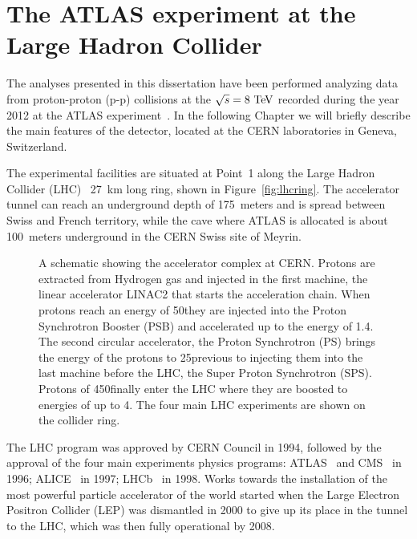 \clearpage{\pagestyle{empty}\cleardoublepage}

\chapter{The ATLAS experiment at the Large Hadron Collider}\label{chap:atlas}

The analyses presented in this dissertation have been performed analyzing data from 
proton-proton (p-p) collisions at the \cme $\rts=8\tev$ recorded during the year 2012 
at the ATLAS experiment~\cite{Aad:2008zzm}. In the following Chapter we will briefly 
describe the main features of the detector, located at the CERN laboratories in Geneva,
Switzerland.

The experimental facilities are situated at Point~1 along the Large Hadron Collider 
(LHC)~\cite{lhc} 27~km long ring, shown in Figure~\ref{fig:lhcring}. The accelerator
tunnel can reach an underground depth of 175~meters and is spread between Swiss
and French territory, while the cave where ATLAS is allocated is about 100~meters 
underground in the CERN Swiss site of Meyrin. 

\begin{figure}[tb]\begin{center}
	\caption{A schematic showing the accelerator complex at CERN. Protons are
        extracted from Hydrogen gas and injected in the first machine, the linear 
        accelerator LINAC2 that starts the acceleration chain. When protons reach
        an energy of 50\mev they are injected into the Proton Synchrotron Booster
        (PSB) and accelerated up to the energy of 1.4\gev. The second circular
        accelerator, the Proton Synchrotron (PS) brings the energy of the protons
        to 25\gev previous to injecting them into the last machine before the LHC,
        the Super Proton Synchrotron (SPS). Protons of 450\gev finally enter the
        LHC where they are boosted to energies of up to 4\tev.
        The four main LHC experiments are shown on the collider ring.}
\end{center}\end{figure}

The LHC program was approved by CERN Council in 1994, followed by the approval of
the four main experiments physics programs: ATLAS~\cite{Aad:2008zzm} and CMS~\cite{cms}
in 1996; ALICE~\cite{alice} in 1997; LHCb~\cite{lhcb} in 1998.
Works towards the installation of the most powerful particle accelerator of the world
started when the Large Electron Positron Collider (LEP) was dismantled in 2000 to 
give up its place in the tunnel to the LHC, which was then fully operational by 2008.

